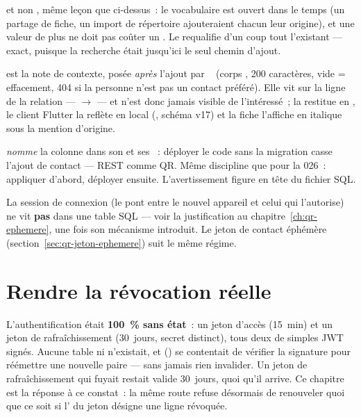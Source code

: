  et non , même leçon que  ci-dessus~:
le vocabulaire est ouvert dans le temps (un partage de fiche, un import de répertoire
ajouteraient chacun leur origine), et une valeur de plus ne doit pas coûter un
. Le  requalifie d'un coup tout l'existant ---
exact, puisque la recherche était jusqu'ici le seul chemin d'ajout.

 est la note de contexte, posée \emph{après} l'ajout par
\mPUT~ (corps , 200
caractères, vide = effacement, 404 si la personne n'est pas un contact préféré). Elle vit
sur la ligne de la relation ---  $\to$  --- et n'est donc
jamais visible de l'intéressé~;  la restitue en , le
client Flutter la reflète en local (, schéma v17) et la
fiche l'affiche en italique sous la mention d'origine.

\begin{alerte}
 \emph{nomme} la colonne dans son  et ses
~: déployer le code sans la migration casse l'ajout de contact --- REST
comme QR. Même discipline que pour la 026~: appliquer d'abord, déployer ensuite.
L'avertissement figure en tête du fichier SQL.
\end{alerte}

\begin{alerte}
La session de connexion (le pont entre le nouvel appareil et celui qui l'autorise) ne vit
\textbf{pas} dans une table SQL --- voir la justification au
chapitre~\ref{ch:qr-ephemere}, une fois son mécanisme introduit. Le jeton de contact
éphémère (section~\ref{sec:qr-jeton-ephemere}) suit le même régime.
\end{alerte}

\chapter{Rendre la révocation réelle}
\label{ch:revocation}

\begin{constat}
L'authentification était \textbf{100~\% sans état}~: un jeton d'accès (15~min) et un
jeton de rafraîchissement (30~jours, secret distinct), tous deux de simples JWT signés.
Aucune table  ni  n'existait, et
 () se contentait de
vérifier la signature pour réémettre une nouvelle paire --- sans jamais rien invalider. Un
jeton de rafraîchissement qui fuyait restait valide 30~jours, quoi qu'il arrive. Ce
chapitre est la réponse à ce constat~: la même route refuse désormais de renouveler quoi
que ce soit si l' du jeton désigne une ligne révoquée.
\end{constat}

